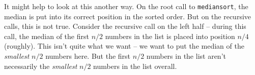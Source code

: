 \begin{prob}
\begin{soln}
        It might help to look at this another way. On the root call to
        \texttt{mediansort}, the median is put into its correct position in the
        sorted order. But on the recursive calls, this is not true. Consider
        the recursive call on the left half -- during this call, the median of
        the first $n/2$ numbers in the list is placed into position $n/4$
        (roughly). This isn't quite what we want -- we want to put the median
        of the \emph{smallest} $n/2$ numbers here. But the first $n/2$ numbers
        in the list aren't necessarily the \emph{smallest} $n/2$ numbers in the
        list overall.

    \end{soln}

\end{prob}
